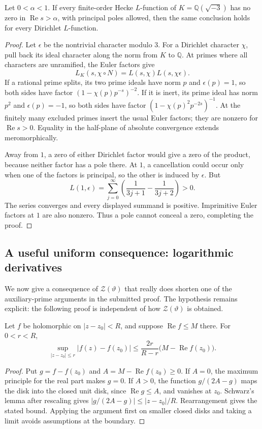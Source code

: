 \begin{proposition}
\label{prop:qrh-basechange}
Let $0<\alpha<1$. If every finite-order Hecke $L$-function of
$K=\mathbb Q(\sqrt{-3})$ has no zero in
$\operatorname{Re}s>\alpha$, with principal poles allowed,
then the same conclusion holds for every Dirichlet $L$-function.
\end{proposition}
\begin{proof}
Let $\epsilon$ be the nontrivial character modulo $3$.
For a Dirichlet character $\chi$, pull back its ideal character
along the norm from $K$ to $\mathbb Q$. At primes where all
characters are unramified, the Euler factors give
\[
 L_K(s,\chi\circ N)=L(s,\chi)L(s,\chi\epsilon).
\]
If a rational prime splits, its two prime ideals have norm $p$
and $\epsilon(p)=1$, so both sides have factor
$(1-\chi(p)p^{-s})^{-2}$. If it is inert, its prime ideal
has norm $p^2$ and $\epsilon(p)=-1$, so both sides have
factor $(1-\chi(p)^2p^{-2s})^{-1}$.
At the finitely many excluded primes insert the usual Euler
factors; they are nonzero for $\operatorname{Re}s>0$.
Equality in the half-plane of absolute convergence extends
meromorphically.

Away from $1$, a zero of either Dirichlet factor would give
a zero of the product, because neither factor has a pole
there. At $1$, a cancellation could occur only when one of
the factors is principal, so the other is induced by
$\epsilon$. But
\[
 L(1,\epsilon)=\sum_{j=0}^\infty
      \left(\frac1{3j+1}-\frac1{3j+2}\right)>0.
\]
The series converges and every displayed summand is positive.
Imprimitive Euler factors at $1$ are also nonzero. Thus a
pole cannot conceal a zero, completing the proof.
\end{proof}

\subsection{A useful uniform consequence: logarithmic derivatives}

We now give a consequence of $\mathcal Z(\vartheta)$ that
really does shorten one of the auxiliary-prime arguments in
the submitted proof. The hypothesis remains explicit: the
following proof is independent of how $\mathcal Z(\vartheta)$
is obtained.

\begin{lemma}
\label{lem:qrh-log-disk}
Let $f$ be holomorphic on $|z-z_0|<R$, and suppose
$\operatorname{Re}f\le M$ there. For $0<r<R$,
\[
 \sup_{|z-z_0|\le r}|f(z)-f(z_0)|
 \le \frac{2r}{R-r}\bigl(M-\operatorname{Re}f(z_0)\bigr).
\]
\end{lemma}
\begin{proof}
Put $g=f-f(z_0)$ and $A=M-\operatorname{Re}f(z_0)\ge0$.
If $A=0$, the maximum principle for the real part makes
$g=0$. If $A>0$, the function $g/(2A-g)$ maps the disk
into the closed unit disk, since $\operatorname{Re}g\le A$,
and vanishes at $z_0$. Schwarz's lemma after rescaling gives
$|g/(2A-g)|\le |z-z_0|/R$. Rearrangement gives the stated
bound. Applying the argument first on smaller closed disks
and taking a limit avoids assumptions at the boundary.
\end{proof}


